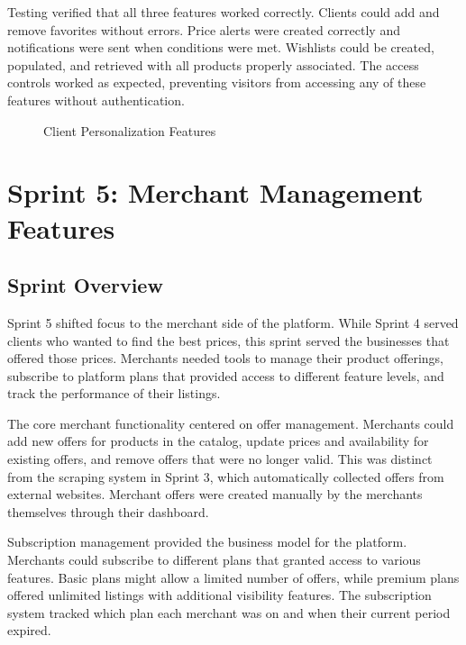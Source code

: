 Testing verified that all three features worked correctly.
Clients could add and remove favorites without errors. Price
alerts were created correctly and notifications were sent when
conditions were met. Wishlists could be created, populated, and
retrieved with all products properly associated. The access
controls worked as expected, preventing visitors from accessing
any of these features without authentication.

\begin{figure}[H]
\begin{center}
\end{center}
\caption{Client Personalization Features}
\label{fig:client_features_interface}
\end{figure}

\section*{Sprint 5: Merchant Management Features}

\subsection*{Sprint Overview}

Sprint 5 shifted focus to the merchant side of the platform.
While Sprint 4 served clients who wanted to find the best
prices, this sprint served the businesses that offered those
prices. Merchants needed tools to manage their product offerings,
subscribe to platform plans that provided access to different
feature levels, and track the performance of their listings.

The core merchant functionality centered on offer management.
Merchants could add new offers for products in the catalog,
update prices and availability for existing offers, and remove
offers that were no longer valid. This was distinct from the
scraping system in Sprint 3, which automatically collected offers
from external websites. Merchant offers were created manually
by the merchants themselves through their dashboard.

Subscription management provided the business model for the
platform. Merchants could subscribe to different plans that
granted access to various features. Basic plans might allow a
limited number of offers, while premium plans offered unlimited
listings with additional visibility features. The subscription
system tracked which plan each merchant was on and when their
current period expired.

